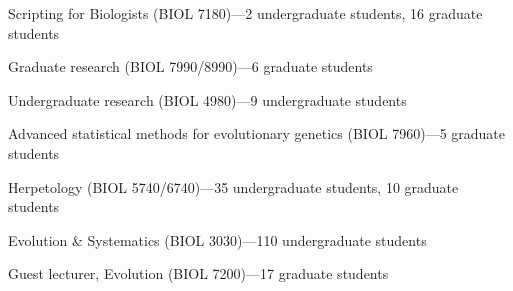 \begin{veryTightItemize}
    \item Scripting for Biologists (BIOL 7180)---2 undergraduate students, 16 graduate students
    \item Graduate research (BIOL 7990/8990)---6 graduate students
    \item Undergraduate research (BIOL 4980)---9 undergraduate students
    \item Advanced statistical methods for evolutionary genetics (BIOL 7960)---5 graduate students
    \item Herpetology (BIOL 5740/6740)---35 undergraduate students, 10 graduate students
    \item Evolution \& Systematics (BIOL 3030)---110 undergraduate students
    \item Guest lecturer, Evolution (BIOL 7200)---17 graduate students
\end{veryTightItemize}
